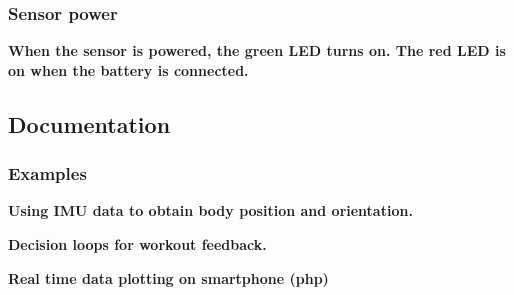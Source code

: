 {\bfseries{{\bfseries{\subsubsection*{Sensor power}}}}}

{\bfseries{{\bfseries{ When the sensor is powered, the green L\+ED turns on. The red L\+ED is on when the battery is connected.}}}}

{\bfseries{{\bfseries{\subsection*{Documentation}}}}}

{\bfseries{{\bfseries{}}}}

{\bfseries{{\bfseries{\subsubsection*{Examples}}}}}

{\bfseries{{\bfseries{ Using I\+MU data to obtain body position and orientation.}}}}

{\bfseries{{\bfseries{Decision loops for workout feedback.}}}}

{\bfseries{{\bfseries{Real time data plotting on smartphone (php) }}}}